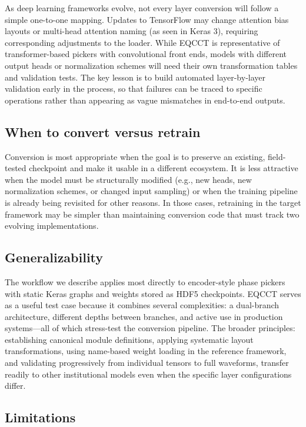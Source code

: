 As deep learning frameworks evolve, not every layer conversion will follow a simple one-to-one mapping. Updates to TensorFlow may change attention bias layouts or multi-head attention naming (as seen in Keras 3), requiring corresponding adjustments to the loader. While EQCCT is representative of transformer-based pickers with convolutional front ends, models with different output heads or normalization schemes will need their own transformation tables and validation tests. The key lesson is to build automated layer-by-layer validation early in the process, so that failures can be traced to specific operations rather than appearing as vague mismatches in end-to-end outputs.

\subsection{When to convert versus retrain}

Conversion is most appropriate when the goal is to preserve an existing, field-tested checkpoint and make it usable in a different ecosystem. It is less attractive when the model must be structurally modified (e.g., new heads, new normalization schemes, or changed input sampling) or when the training pipeline is already being revisited for other reasons. In those cases, retraining in the target framework may be simpler than maintaining conversion code that must track two evolving implementations.

\subsection{Generalizability}

The workflow we describe applies most directly to encoder-style phase pickers with static Keras graphs and weights stored as HDF5 checkpoints. EQCCT serves as a useful test case because it combines several complexities: a dual-branch architecture, different depths between branches, and active use in production systems---all of which stress-test the conversion pipeline. The broader principles: establishing canonical module definitions, applying systematic layout transformations, using name-based weight loading in the reference framework, and validating progressively from individual tensors to full waveforms, transfer readily to other institutional models even when the specific layer configurations differ.

\subsection{Limitations}

